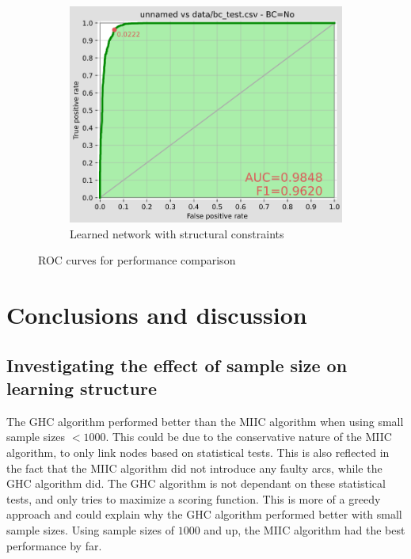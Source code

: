 \documentclass{article}
\begin{document}
\begin{figure}[H]
\begin{subfigure}{0.3\textwidth}
    \centering
    \includegraphics[width=\linewidth]{../figures/roc_steered.png}
    \caption{Learned network with structural constraints}
    \label{fig:subfig3}
\end{subfigure}
\caption{ROC curves for performance comparison}
\label{fig:horizontal_figures}
\end{figure}
\section{Conclusions and discussion}
\subsection{Investigating the effect of sample size on learning structure}
The GHC algorithm performed better than the MIIC algorithm when using small sample sizes $<1000$. This could be due to the conservative nature of the MIIC algorithm, to only link nodes based on statistical tests.
This is also reflected in the fact that the MIIC algorithm did not introduce any faulty arcs, while the GHC algorithm did. The GHC algorithm is not dependant on these statistical tests, and only tries to maximize a scoring function.
This is more of a greedy approach and could explain why the GHC algorithm performed better with small sample sizes. Using sample sizes of $1000$ and up, the MIIC algorithm had the best performance by far.
\end{document}
